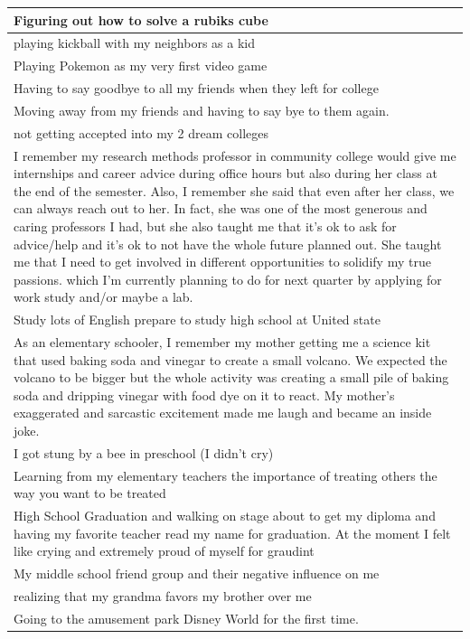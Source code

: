 \documentclass[
  .7em,
  letterpaper,
  DIV=11,
  numbers=noendperiod]{scrartcl}
\begin{document}
\begin{table}
\begin{tabular}{l}
\hline
Figuring out how to solve a rubiks cube\\
\hline
playing kickball with my neighbors as a kid\\
\hline
Playing Pokemon as my very first video game\\
\hline
Having to say goodbye to all my friends when they left for college\\
\hline
Moving away from my friends and having to say bye to them again.\\
\hline
not getting accepted into my 2 dream colleges\\
\hline
I remember my research methods professor in community college would give me internships and career advice during office hours but also during her class at the end of the semester. Also, I remember she said that even after her class, we can always reach out to her. In fact, she was one of the most generous and caring professors I had, but she also taught me that it's ok to ask for advice/help and it's ok to not have the whole future planned out. She taught me that I need to get involved in different opportunities to solidify my true passions. which I'm currently planning to do for next quarter by applying for work study and/or maybe a lab.\\
\hline
Study lots of English prepare to study high school at United state\\
\hline
As an elementary schooler, I remember my mother getting me a science kit that used baking soda and vinegar to create a small volcano. We expected the volcano to be bigger but the whole activity was creating a small pile of baking soda and dripping vinegar with food dye on it to react. My mother’s exaggerated and sarcastic excitement made me laugh and became an inside joke.\\
\hline
I got stung by a bee in preschool (I didn't cry)\\
\hline
Learning from my elementary teachers the importance of treating others the way you want to be treated\\
\hline
High School Graduation and walking on stage about to get my diploma and having my favorite teacher read my name for graduation. At the moment I felt like crying and extremely proud of myself for graudint\\
\hline
My middle school friend group and their negative influence on me\\
\hline
realizing that my grandma favors my brother over me\\
\hline
Going to the amusement park Disney World for the first time.\\

\end{tabular}
\end{table}
\end{document}
